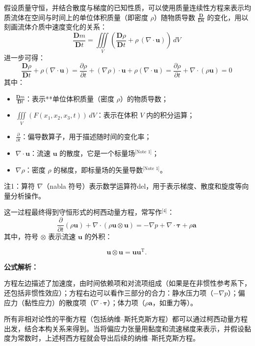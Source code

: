 假设质量守恒，并结合散度与梯度的已知性质，可以使用质量连续性方程来表示均质流体在空间与时间上的单位体积质量（即密度 $\rho$）随物质导数 $\displaystyle \frac{\mathbf{D}}{\mathbf{Dt}}$ 的变化，用以刻画流体介质中速度变化的关系：
$$
\frac{\mathbf{D} m}{\mathbf{D} t}
= \iiint\limits_{V} 
\left(
\frac{\mathbf{D} \rho}{\mathbf{D} t}
+ \rho \, (\nabla \cdot \mathbf{u})
\right)
\, dV~
$$
进一步可得：
$$
\frac{\mathbf{D} \rho}{\mathbf{D} t}
+ \rho (\nabla \cdot \mathbf{u})
= \frac{\partial \rho}{\partial t}
+ (\nabla \rho) \cdot \mathbf{u}
+ \rho (\nabla \cdot \mathbf{u})
= \frac{\partial \rho}{\partial t}
+ \nabla \cdot (\rho \mathbf{u})
= 0~
$$
其中：
\begin{itemize}
\item $\displaystyle \frac{\mathbf{D} m}{\mathbf{D} t}$：表示**单位体积质量（密度 $\rho$）的物质导数；
\item $\displaystyle \iiint\limits_{V} (F(x_{1},x_{2},x_{3},t))\,dV$：表示在体积 $V$ 内的积分运算；
\item $\displaystyle \frac{\partial}{\partial t}$：偏导数算子，用于描述随时间的变化率；
\item $\displaystyle \nabla \cdot \mathbf{u}$：流速 $\mathbf{u}$ 的散度，它是一个标量场\(^\text{[Note 1]}\)；
\item $\displaystyle \nabla \rho$：密度 $\rho$ 的梯度，即标量场的矢量导数\(^\text{[Note 1]}\)。
\end{itemize}
注1：算符 $\nabla$（nabla 符号）表示数学运算符del，用于表示梯度、散度和旋度等向量分析操作。

这一过程最终得到守恒形式的柯西动量方程，常写作\(^\text{[4]}\)：
$$
\frac{\partial}{\partial t}(\rho \mathbf{u})
+ \nabla \cdot (\rho \mathbf{u} \otimes \mathbf{u})
= -\nabla p
+ \nabla \cdot \boldsymbol{\tau}
+ \rho \mathbf{a}~
$$
其中，符号 $\otimes$ 表示流速 $\mathbf{u}$ 的外积：

$$
\mathbf{u} \otimes \mathbf{u} = \mathbf{u} \mathbf{u}^\mathrm{T}.~
$$

\textbf{公式解析：}

方程左边描述了加速度，由时间依赖项和对流项组成（如果是在非惯性参考系下，还包括非惯性效应）；方程右边可以看作三部分的合力：静水压力项（$-\nabla p$）；偏应力（黏性应力）的散度项（$\nabla \cdot \boldsymbol{\tau}$）；体力项（$\rho \mathbf{a}$，如重力等）。

所有非相对论性的平衡方程（包括纳维–斯托克斯方程）都可以通过柯西动量方程出发，结合本构关系来得到。当将偏应力张量用黏度和流速梯度来表示，并假设黏度为常数时，上述柯西方程就会导出后续的纳维–斯托克斯方程。
